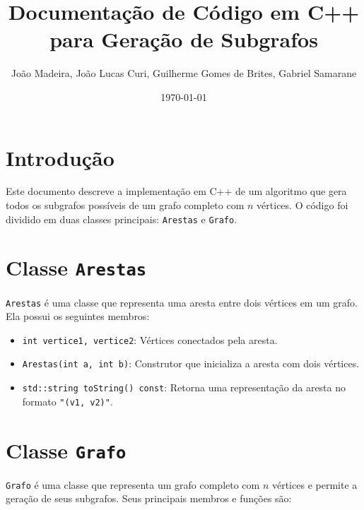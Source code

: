 \documentclass{article}
\title{Documentação de Código em C++ para Geração de Subgrafos}
\author{João Madeira, João Lucas Curi, Guilherme Gomes de Brites, Gabriel Samarane}
\date{\today}
\begin{document}
\maketitle

\section{Introdução}
Este documento descreve a implementação em C++ de um algoritmo que gera todos os subgrafos possíveis de um grafo completo com \( n \) vértices. O código foi dividido em duas classes principais: \texttt{Arestas} e \texttt{Grafo}.

\section{Classe \texttt{Arestas}}

\texttt{Arestas} é uma classe que representa uma aresta entre dois vértices em um grafo. Ela possui os seguintes membros:

\begin{itemize}
    \item \texttt{int vertice1, vertice2}: Vértices conectados pela aresta.
    \item \texttt{Arestas(int a, int b)}: Construtor que inicializa a aresta com dois vértices.
    \item \texttt{std::string toString() const}: Retorna uma representação da aresta no formato \texttt{"(v1, v2)"}.
\end{itemize}

\section{Classe \texttt{Grafo}}

\texttt{Grafo} é uma classe que representa um grafo completo com \( n \) vértices e permite a geração de seus subgrafos. Seus principais membros e funções são:
\end{document}
